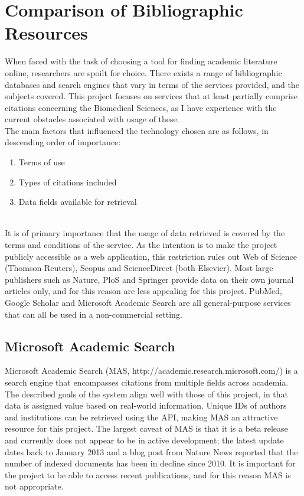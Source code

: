 \documentclass[PROP_AGutteridge_CS.tex]{subfiles}
\begin{document}
\chapter{Comparison of Bibliographic Resources}
When faced with the task of choosing a tool for finding academic literature online, researchers are spoilt for choice. There exists a range of bibliographic databases and search engines that vary in terms of the services provided, and the subjects covered. This project focuses on services that at least partially comprise citations concerning the Biomedical Sciences, as I have experience with the current obstacles associated with usage of these.\\

\noindent The main factors that influenced the technology chosen are as follows, in descending order of importance:
\begin{enumerate}
\item Terms of use
\item Types of citations included
\item Data fields available for retrieval
\end{enumerate}

\noindent \\ It is of primary importance that the usage of data retrieved is covered by the terms and conditions of the service. As the intention is to make the project publicly accessible as a web application, this restriction rules out Web of Science (Thomson Reuters), Scopus and ScienceDirect (both Elsevier). Most large publishers such as Nature, PloS and Springer provide data on their own journal articles only, and for this reason are less appealing for this project. PubMed, Google Scholar and Microsoft Academic Search are all general-purpose services that can all be used in a non-commercial setting.

\noindent \section{Microsoft Academic Search}
Microsoft Academic Search (MAS, http://academic.research.microsoft.com/) is a search engine that encompasses citations from multiple fields across academia. The described goals of the system align well with those of this project, in that data is assigned value based on real-world information\cite{microsoft-help}. Unique IDs of authors and institutions can be retrieved using the API, making MAS an attractive resource for this project. The largest caveat of MAS is that it is a beta release and currently does not appear to be in active development; the latest update dates back to January 2013\cite{microsoft-help} and a blog post from Nature News reported that the number of indexed documents has been in decline since 2010\cite{nature-news}. It is important for the project to be able to access recent publications, and for this reason MAS is not appropriate.
\end{document}

